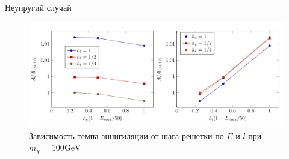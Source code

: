Неупругий случай
\begin{figure}[!h]
	\centering
	\includegraphics[width=\textwidth]{images/ConvInel.png}
	\caption{Зависимость  темпа аннигиляции от шага решетки по $E$ и $l$ при $m_{\chi} = 100 \text{GeV}$}
\end{figure}